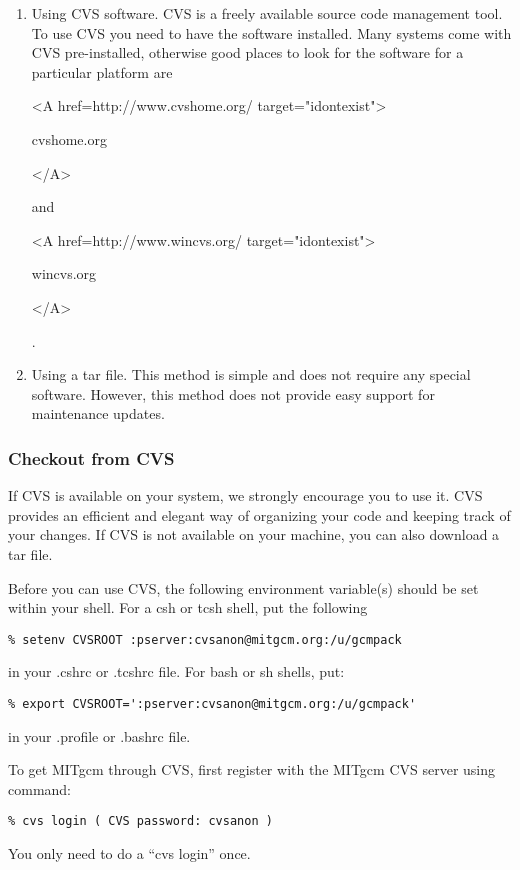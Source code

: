 \begin{enumerate}
\item Using CVS software. CVS is a freely available source code management
tool. To use CVS you need to have the software installed. Many systems
come with CVS pre-installed, otherwise good places to look for
the software for a particular platform are
\begin{rawhtml} <A href=http://www.cvshome.org/ target="idontexist"> \end{rawhtml}
cvshome.org
\begin{rawhtml} </A> \end{rawhtml}
and
\begin{rawhtml} <A href=http://www.wincvs.org/ target="idontexist"> \end{rawhtml}
wincvs.org
\begin{rawhtml} </A> \end{rawhtml}
.

\item Using a tar file. This method is simple and does not
require any special software. However, this method does not
provide easy support for maintenance updates.

\end{enumerate}

\subsubsection{Checkout from CVS}
\label{sect:cvs_checkout}

If CVS is available on your system, we strongly encourage you to use it. CVS
provides an efficient and elegant way of organizing your code and keeping
track of your changes. If CVS is not available on your machine, you can also
download a tar file.

Before you can use CVS, the following environment variable(s) should
be set within your shell.  For a csh or tcsh shell, put the following 
\begin{verbatim}
% setenv CVSROOT :pserver:cvsanon@mitgcm.org:/u/gcmpack
\end{verbatim}
in your .cshrc or .tcshrc file.  For bash or sh shells, put:
\begin{verbatim}
% export CVSROOT=':pserver:cvsanon@mitgcm.org:/u/gcmpack'
\end{verbatim}
in your .profile or .bashrc file.


To get MITgcm through CVS, first register with the MITgcm CVS server
using command:
\begin{verbatim}
% cvs login ( CVS password: cvsanon )
\end{verbatim}
You only need to do a ``cvs login'' once.

